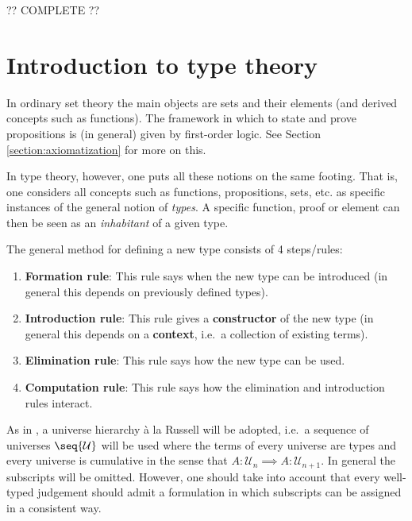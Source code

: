     ?? COMPLETE ??

\section{Introduction to type theory}

    In ordinary set theory the main objects are sets and their elements (and derived concepts such as functions). The framework in which to state and prove propositions is (in general) given by first-order logic. See Section \ref{section:axiomatization} for more on this.

    In type theory, however, one puts all these notions on the same footing. That is, one considers all concepts such as functions, propositions, sets, etc. as specific instances of the general notion of \textit{types}. A specific function, proof or element can then be seen as an \textit{inhabitant} of a given type.

    \begin{method}
        The general method for defining a new type consists of 4 steps/rules:
        \begin{enumerate}
            \item \textbf{Formation rule}: This rule says when the new type can be introduced (in general this depends on previously defined types).
            \item \textbf{Introduction rule}: This rule gives a \textbf{constructor} of the new type (in general this depends on a \textbf{context}, i.e.~a collection of existing terms).
            \item \textbf{Elimination rule}: This rule says how the new type can be used.
            \item \textbf{Computation rule}: This rule says how the elimination and introduction rules interact.
        \end{enumerate}
    \end{method}

    As in \cite{hott}, a universe hierarchy \`a la Russell will be adopted, i.e.~a sequence of universes $\seq{\mathcal{U}}$ will be used where the terms of every universe are types and every universe is cumulative in the sense that $A:\mathcal{U}_n\implies A:\mathcal{U}_{n+1}$. In general the subscripts will be omitted. However, one should take into account that every well-typed judgement should admit a formulation in which subscripts can be assigned in a consistent way.

